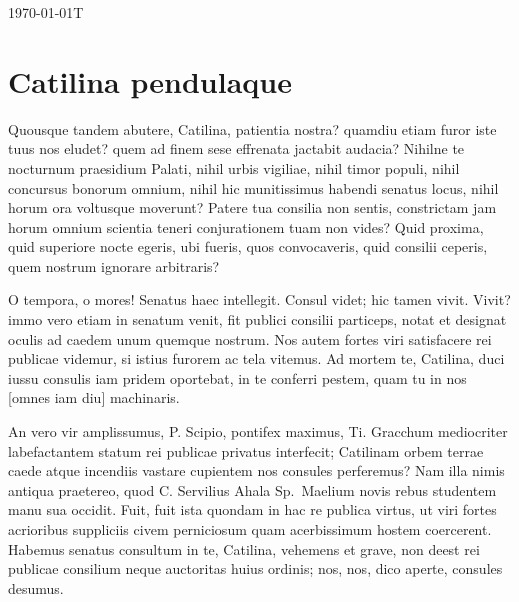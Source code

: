 \documentclass[12pt, twoside]{article}
\begin{document}
%
\noindent
\today T\currenttime
\section*{Catilina pendulaque}
Quousque tandem abutere, Catilina, patientia nostra? quamdiu etiam furor iste tuus nos eludet? quem ad finem sese effrenata jactabit audacia? Nihilne te nocturnum praesidium Palati, nihil urbis vigiliae, nihil timor populi, nihil concursus bonorum omnium, nihil hic munitissimus habendi senatus locus, nihil horum ora voltusque moverunt? Patere tua consilia non sentis, constrictam jam horum omnium scientia teneri conjurationem tuam non vides? Quid proxima, quid superiore nocte egeris, ubi fueris, quos convocaveris, quid consilii ceperis, quem nostrum ignorare arbitraris?

O tempora, o mores! Senatus haec intellegit. Consul videt; hic tamen vivit. Vivit? immo vero etiam in senatum venit, fit publici consilii particeps, notat et designat oculis ad caedem unum quemque nostrum. Nos autem fortes viri satisfacere rei publicae videmur, si istius furorem ac tela vitemus. Ad mortem te, Catilina, duci iussu consulis iam pridem oportebat, in te conferri pestem, quam tu in nos [omnes iam diu] machinaris.

An vero vir amplissumus, P. Scipio, pontifex maximus, Ti. Gracchum mediocriter labefactantem statum rei publicae privatus interfecit; Catilinam orbem terrae caede atque incendiis vastare cupientem nos consules perferemus? Nam illa nimis antiqua praetereo, quod C. Servilius Ahala Sp.\ Maelium novis rebus studentem manu sua occidit. Fuit, fuit ista quondam in hac re publica virtus, ut viri fortes acrioribus suppliciis civem perniciosum quam acerbissimum hostem coercerent. Habemus senatus consultum in te, Catilina, vehemens et grave, non deest rei publicae consilium neque auctoritas huius ordinis; nos, nos, dico aperte, consules desumus.
\end{document}
